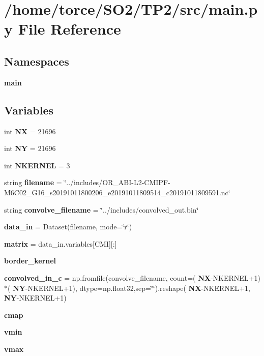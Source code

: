 \section{/home/torce/\+S\+O2/\+T\+P2/src/main.py File Reference}
\label{main_8py}
\subsection*{Namespaces}
\begin{DoxyCompactItemize}
\item 
 \textbf{ main}
\end{DoxyCompactItemize}
\subsection*{Variables}
\begin{DoxyCompactItemize}
\item 
int \textbf{ NX} = 21696
\item 
int \textbf{ NY} = 21696
\item 
int \textbf{ N\+K\+E\+R\+N\+EL} = 3
\item 
string \textbf{ filename} = \char`\"{}../includes/O\+R\+\_\+\+A\+BI-\/L2-\/C\+M\+I\+PF-\/M6\+C02\+\_\+\+G16\+\_\+s20191011800206\+\_\+e20191011809514\+\_\+c20191011809591.\+nc\char`\"{}
\item 
string \textbf{ convolve\+\_\+filename} = \char`\"{}../includes/convolved\+\_\+out.\+bin\char`\"{}
\item 
\textbf{ data\+\_\+in} = Dataset(filename, mode=\char`\"{}r\char`\"{})
\item 
\textbf{ matrix} = data\+\_\+in.\+variables[\textquotesingle{}C\+MI\textquotesingle{}][\+:]
\item 
\textbf{ border\+\_\+kernel}
\item 
\textbf{ convolved\+\_\+in\+\_\+c} = np.\+fromfile(convolve\+\_\+filename, count=(\textbf{ NX}-\/N\+K\+E\+R\+N\+EL+1)$\ast$(\textbf{ NY}-\/N\+K\+E\+R\+N\+EL+1), dtype=np.\+float32,sep=\char`\"{}\char`\"{}).reshape(\textbf{ NX}-\/N\+K\+E\+R\+N\+EL+1,\textbf{ NY}-\/N\+K\+E\+R\+N\+EL+1)
\item 
\textbf{ cmap}
\item 
\textbf{ vmin}
\item 
\textbf{ vmax}
\end{DoxyCompactItemize}
